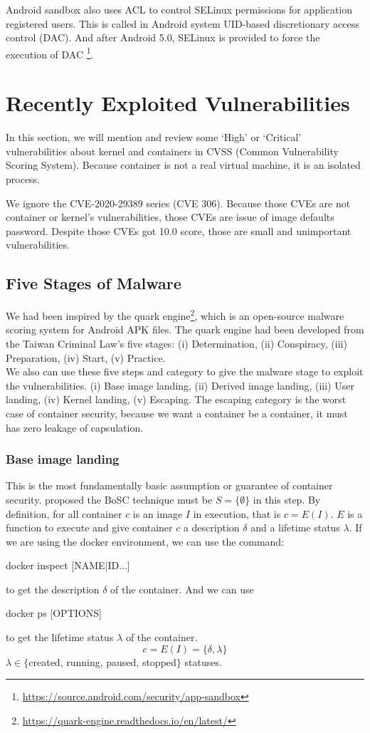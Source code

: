 Android sandbox also uses ACL to control SELinux permissions for application registered users.
This is called in Android system UID-based discretionary access control (DAC).
And after Android 5.0, SELinux is provided to force the execution of DAC
\footnote{\url{https://source.android.com/security/app-sandbox}}.

\section{Recently Exploited Vulnerabilities}
In this section, we will mention and review some `High' or `Critical' vulnerabilities
about kernel and containers in CVSS (Common Vulnerability Scoring System).
Because container is not a real virtual machine, it is an isolated process.

We ignore the CVE-2020-29389 series (CVE 306). Because those CVEs are not container or kernel's
vulnerabilities, those CVEs are issue of image defaults password. Despite those CVEs got 10.0 score,
those are small and unimportant vulnerabilities.

\subsection{Five Stages of Malware}
We had been inspired by the quark engine\footnote{\url{https://quark-engine.readthedocs.io/en/latest/}},
which is an open-source malware scoring system for Android APK files. The quark
engine had been developed from the Taiwan Criminal Law's five stages:
(\Rn{1}) Determination, (\Rn{2}) Conspiracy, (\Rn{3}) Preparation, (\Rn{4}) Start, (\Rn{5}) Practice.\\

We also can use these five steps and category to give the malware stage to exploit the vulnerabilities.
(\Rn{1}) Base image landing, (\Rn{2}) Derived image landing, (\Rn{3}) User landing, (\Rn{4}) Kernel landing,
(\Rn{5}) Escaping. The escaping category is the worst case of container security, because we want a
container be a container, it must has zero leakage of capsulation.

\subsubsection{Base image landing}
This is the most fundamentally basic assumption or guarantee of container security.
\textcite{inproceedings} proposed the BoSC technique must be $S = \{\emptyset\}$ in this step. By definition, for all
container $c$ is an image $I$ in execution, that is  $c = E(I)$. $E$ is a function to execute and
give container $c$ a description $\delta$ and a lifetime status $\lambda$. If we are using the docker environment, we can use the command:
\begin{codebash}
    docker inspect [NAME|ID...]
\end{codebash}
to get the description $\delta$ of the container. And we can use
\begin{codebash}
    docker ps [OPTIONS]
\end{codebash}
to get the lifetime status $\lambda$ of the container.
$$c=E(I)=\{\delta, \lambda\}$$
$\lambda \in \{$created, running, paused, stopped$\}$ statuses.

